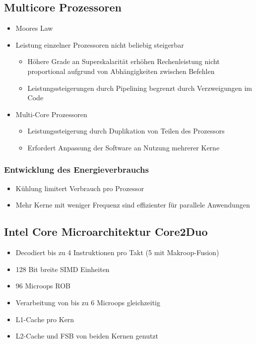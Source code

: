 \subsection{Multicore Prozessoren}
\begin{itemize}
	\item Moores Law
	\item Leistung einzelner Prozessoren nicht beliebig steigerbar
	\begin{itemize}
		\item Höhere Grade an Superskalarität erhöhen Rechenleistung nicht proportional aufgrund von Abhängigkeiten zwischen Befehlen
		\item Leistungssteigerungen durch Pipelining begrenzt durch Verzweigungen im Code
	\end{itemize}
	\item Multi-Core Prozessoren
	\begin{itemize}
		\item Leistungssteigerung durch Duplikation von Teilen des Prozessors
		\item Erfordert Anpassung der Software an Nutzung mehrerer Kerne
	\end{itemize}
\end{itemize}
\subsubsection{Entwicklung des Energieverbrauchs}
\begin{itemize}
	\item Kühlung limitert Verbrauch pro Prozessor
	\item Mehr Kerne mit weniger Frequenz sind effizienter für parallele Anwendungen
\end{itemize}
\subsection{Intel Core Microarchitektur Core2Duo}
\begin{itemize}
	\item Decodiert bis zu 4 Instruktionen pro Takt (5 mit Makroop-Fusion)
	\item 128 Bit breite SIMD Einheiten 
	\item 96 Microops ROB
	\item Verarbeitung von bis zu 6 Microops gleichzeitig
	\item L1-Cache pro Kern
	\item L2-Cache und FSB von beiden Kernen genutzt
\end{itemize}
